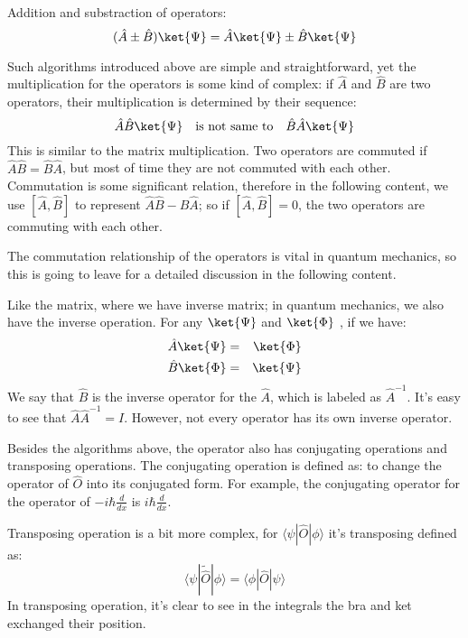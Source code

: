 Addition and substraction of operators:
\begin{equation}\label{}
(\hat{A} \pm \hat{B})\ket{\Psi} = \hat{A}\ket{\Psi} \pm \hat{B} \ket{\Psi}
\end{equation}

Such algorithms introduced above are simple and straightforward, yet
the multiplication for the operators is some kind of complex: if
$\hat{A}$ and $\hat{B}$ are two operators, their multiplication is
determined by their sequence:
\begin{equation}\label{}
\hat{A}\hat{B}\ket{\Psi} \quad \text{is not same to} \quad
\hat{B}\hat{A}\ket{\Psi} \nonumber
\end{equation}
This is similar to the matrix multiplication. Two operators are
commuted if $\hat{A}\hat{B} = \hat{B}\hat{A}$, but most of time they
are not commuted with each other. Commutation is some significant
relation, therefore in the following content, we use $[\hat{A},
\hat{B}]$ to represent $\hat{A}\hat{B} - \hat{B}\hat{A}$; so if
$[\hat{A}, \hat{B}] = 0$, the two operators are commuting with each
other.

The commutation relationship of the operators is vital in quantum
mechanics, so this is going to leave for a detailed discussion in
the following content.

Like the matrix, where we have inverse matrix; in quantum mechanics,
we also have the inverse operation. For any $\ket{\Psi}$ and
$\ket{\Phi}$ , if we have:
\begin{eqnarray}
  \hat{A}\ket{\Psi} &=& \ket{\Phi}  \nonumber \\
  \hat{B}\ket{\Phi} &=& \ket{\Psi}
\end{eqnarray}
We say that $\hat{B}$ is the inverse operator for the $\hat{A}$,
which is labeled as $\hat{A}^{-1}$. It's easy to see that
$\hat{A}\hat{A}^{-1} = I$. However, not every operator has its own
inverse operator.

Besides the algorithms above, the operator also has conjugating
operations and transposing operations. The conjugating operation is
defined as: to change the operator of $\hat{O}$ into its conjugated
form. For example, the conjugating operator for the operator of
$-i\hbar \frac{d}{dx}$ is $i\hbar \frac{d}{dx}$.

Transposing operation is a bit more complex, for $\langle\psi|
\hat{O}|\phi\rangle$ it's transposing defined as:
\begin{equation}\label{OPERATOReq:5}
\langle\psi|\widetilde{\hat{O}}|\phi\rangle = \langle\phi|
\hat{O}|\psi\rangle
\end{equation}
In transposing operation, it's clear to see in the integrals the bra
and ket exchanged their position.

